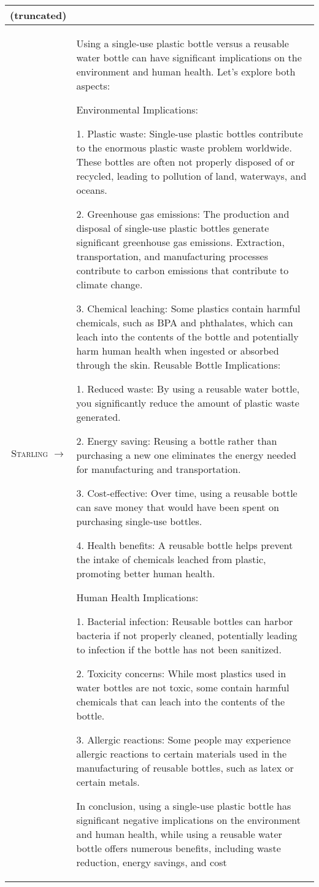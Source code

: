 \documentclass{article}
\newlength\mydepth
\newcommand{\starlingemojititle}{\textsc{Starling}\raisebox{-\mydepth}{\texttt{[image: images/starling-final.png]}}}
\begin{document}
{{\begin{tabularx}{\linewidth}{r X}
(truncated)
\\
 \midrule \starlingemojititle{} $\to$ &
Using a single-use plastic bottle versus a reusable water bottle can have significant implications on the environment and human health. Let's explore both aspects:

Environmental Implications:

1. Plastic waste: Single-use plastic bottles contribute to the enormous plastic waste problem worldwide. These bottles are often not properly disposed of or recycled, leading to pollution of land, waterways, and oceans.

2. Greenhouse gas emissions: The production and disposal of single-use plastic bottles generate significant greenhouse gas emissions. Extraction, transportation, and manufacturing processes contribute to carbon emissions that contribute to climate change.

3. Chemical leaching: Some plastics contain harmful chemicals, such as BPA and phthalates, which can leach into the contents of the bottle and potentially harm human health when ingested or absorbed through the skin.
Reusable Bottle Implications:

1. Reduced waste: By using a reusable water bottle, you significantly reduce the amount of plastic waste generated.

2. Energy saving: Reusing a bottle rather than purchasing a new one eliminates the energy needed for manufacturing and transportation.

3. Cost-effective: Over time, using a reusable bottle can save money that would have been spent on purchasing single-use bottles.

4. Health benefits: A reusable bottle helps prevent the intake of chemicals leached from plastic, promoting better human health.

Human Health Implications:

1. Bacterial infection: Reusable bottles can harbor bacteria if not properly cleaned, potentially leading to infection if the bottle has not been sanitized.

2. Toxicity concerns: While most plastics used in water bottles are not toxic, some contain harmful chemicals that can leach into the contents of the bottle.

3. Allergic reactions: Some people may experience allergic reactions to certain materials used in the manufacturing of reusable bottles, such as latex or certain metals.

In conclusion, using a single-use plastic bottle has significant negative implications on the environment and human health, while using a reusable water bottle offers numerous benefits, including waste reduction, energy savings, and cost 


\end{tabularx}}}
\end{document}
